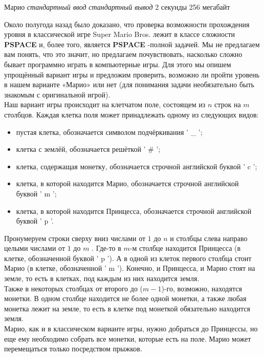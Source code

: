 \begin{problem}%
{Марио}%
{\textsl{стандартный ввод}}%
{\textsl{стандартный вывод}}%
{2 секунды}%
{256 мегабайт}%
{}

Около полугода назад было доказано, что проверка возможности прохождения уровня в классической игре Super Mario Bros. лежит в классе сложности \textbf{PSPACE} и, более того, является \textbf{PSPACE} -полной задачей. Мы не предлагаем вам понять, что это значит, но предлагаем почувствовать, насколько сложно бывает программно играть в компьютерные игры. Для этого мы опишем упрощённый вариант игры и предложим проверить, возможно ли пройти уровень в нашем варианте «Марио» или нет (для понимания задачи необязательно быть знакомым с оригинальной игрой).\\

Наш вариант игры происходит на клетчатом поле, состоящем из $n$ строк на $m$ столбцов. Каждая клетка поля может принадлежать одному из следующих видов:

\begin{itemize}
    \item пустая клетка, обозначается символом подчёркивания ' \_ ';
    \item клетка с землёй, обозначается решёткой ' \# ';
    \item клетка, содержащая монетку, обозначается строчной английской буквой ' c ';
    \item клетка, в которой находится Марио, обозначается строчной английской буквой ' m ';
    \item клетка, в которой находится Принцесса, обозначается строчной английской буквой ' p '.
\end{itemize}

Пронумеруем строки сверху вниз числами от $1$ до $n$ и столбцы слева направо целыми числами от $1$ до $m$ . Где-то в $m$-м столбце находится Принцесса (в клетке, обозначенной буквой ' p '). А в одной из клеток первого столбца стоит Марио (в клетке, обозначенной ' m '). Конечно, и Принцесса, и Марио стоят на земле, то есть в клетках, под каждым из них находится земля.\\

Также в некоторых столбцах от второго до ($m - 1$)-го, возможно, находятся монетки. В одном столбце находится не более одной монетки, а также любая монетка лежит на земле, то есть в клетке под монеткой обязательно находится земля.\\

Марио, как и в классическом варианте игры, нужно добраться до Принцессы, но еще ему необходимо собрать все монетки, которые есть на поле. Марио может перемещаться только посредством прыжков.\\


\end{problem}
